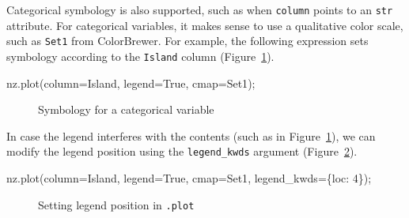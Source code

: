 \documentclass[
  letterpaper,
]{krantz}
\newenvironment{Shaded}{\begin{snugshade}}{\end{snugshade}}
\newcommand{\DecValTok}[1]{\textcolor[rgb]{0.68,0.00,0.00}{#1}}
\newcommand{\NormalTok}[1]{\textcolor[rgb]{0.00,0.23,0.31}{#1}}
\newcommand{\OperatorTok}[1]{\textcolor[rgb]{0.37,0.37,0.37}{#1}}
\newcommand{\StringTok}[1]{\textcolor[rgb]{0.13,0.47,0.30}{#1}}
\newcommand{\VariableTok}[1]{\textcolor[rgb]{0.07,0.07,0.07}{#1}}
\begin{document}
Categorical symbology is also supported, such as when \texttt{column}
points to an \texttt{str} attribute. For categorical variables, it makes
sense to use a qualitative color scale, such as
\texttt{\textquotesingle{}Set1\textquotesingle{}} from ColorBrewer. For
example, the following expression sets symbology according to the
\texttt{\textquotesingle{}Island\textquotesingle{}} column
(Figure~\ref{fig-plot-symbology-categorical}).

\begin{Shaded}
\begin{Highlighting}[]
\NormalTok{nz.plot(column}\OperatorTok{=}\StringTok{\textquotesingle{}Island\textquotesingle{}}\NormalTok{, legend}\OperatorTok{=}\VariableTok{True}\NormalTok{, cmap}\OperatorTok{=}\StringTok{\textquotesingle{}Set1\textquotesingle{}}\NormalTok{)}\OperatorTok{;}
\end{Highlighting}
\end{Shaded}

\begin{figure}[H]


\caption{\label{fig-plot-symbology-categorical}Symbology for a
categorical variable}

\end{figure}%

In case the legend interferes with the contents (such as in
Figure~\ref{fig-plot-symbology-categorical}), we can modify the legend
position using the \texttt{legend\_kwds} argument
(Figure~\ref{fig-plot-legend-pos}).

\begin{Shaded}
\begin{Highlighting}[]
\NormalTok{nz.plot(column}\OperatorTok{=}\StringTok{\textquotesingle{}Island\textquotesingle{}}\NormalTok{, legend}\OperatorTok{=}\VariableTok{True}\NormalTok{, cmap}\OperatorTok{=}\StringTok{\textquotesingle{}Set1\textquotesingle{}}\NormalTok{, legend\_kwds}\OperatorTok{=}\NormalTok{\{}\StringTok{\textquotesingle{}loc\textquotesingle{}}\NormalTok{: }\DecValTok{4}\NormalTok{\})}\OperatorTok{;}
\end{Highlighting}
\end{Shaded}

\begin{figure}[H]


\caption{\label{fig-plot-legend-pos}Setting legend position in
\texttt{.plot}}

\end{figure}%
\end{document}
